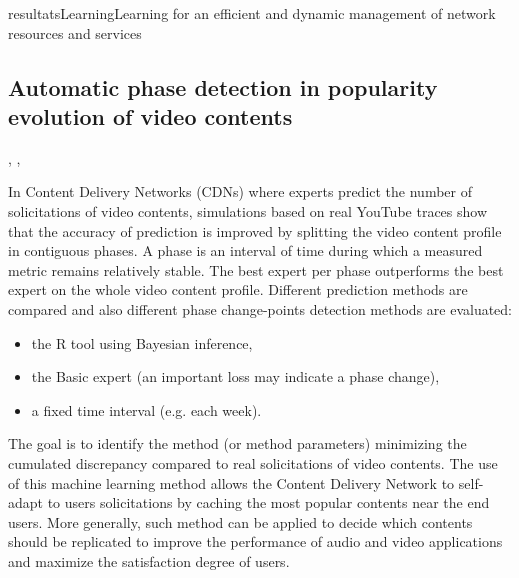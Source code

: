 \documentclass{ra2016}
\begin{document}
\begin{module}{resultats}{Learning}{Learning for an efficient and dynamic management of network resources and services}
\subsection{Automatic phase detection in popularity evolution of video contents}
\begin{participants}
,
,
\end{participants}

In Content Delivery Networks (CDNs) where experts predict the number of solicitations of video contents, simulations based on real YouTube traces show that the accuracy of prediction is improved by splitting the video content profile in contiguous phases. A phase is an interval of time
during which a measured metric remains relatively stable.
 The best expert per phase
outperforms the best expert on the whole video content profile. Different prediction methods are compared and also different phase change-points detection methods are evaluated:
\begin{itemize}
\item the R tool using Bayesian inference,
\item the Basic expert (an important loss may indicate a phase change),
\item a fixed time interval (e.g. each week).
\end{itemize}
The goal is to identify the method (or method parameters) minimizing the cumulated discrepancy compared to real solicitations of video contents.
The use of this machine learning method
allows the Content Delivery Network to self-adapt to users
solicitations by caching the most popular contents near the end
users. More generally, such method can be applied to decide
which contents should be replicated to improve the performance
of audio and video applications and maximize the satisfaction
degree of users.

\end{module}
\end{document}
